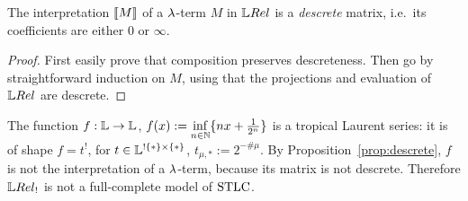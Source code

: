 \begin{proposition}\label{prop:descrete}
 The interpretation $\llbracket M\rrbracket$ of a $\lambda$-term $M$ in $\LREL$ is a \emph{descrete} matrix, i.e.\ its coefficients are either $0$ or $\infty$.
\end{proposition}
\begin{proof}
 First easily prove that composition preserves descreteness.
 Then go by straightforward induction on $M$, using that the projections and evaluation of  $\LREL$ are descrete.
\end{proof}

\begin{example}\label{ex:famous_ex}
 The function $f:\mathbb{L}\to\mathbb{L}$, $f(x):=\inf\limits_{n\in\mathbb{N}}\{nx+\frac{1}{2^n}\}$ is a tropical Laurent series: it is of shape $f=t^!$, for $t\in\mathbb{L}^{!\{*\}\times\{*\}}$, $t_{\mu,*}:=2^{-\# \mu}$.
By Proposition~\ref{prop:descrete}, $f$ is not the interpretation of a $\lambda$-term, because its matrix is not descrete. Therefore $\LREL_!$ is not a full-complete model of $\mathrm{STLC}$.
\end{example}


